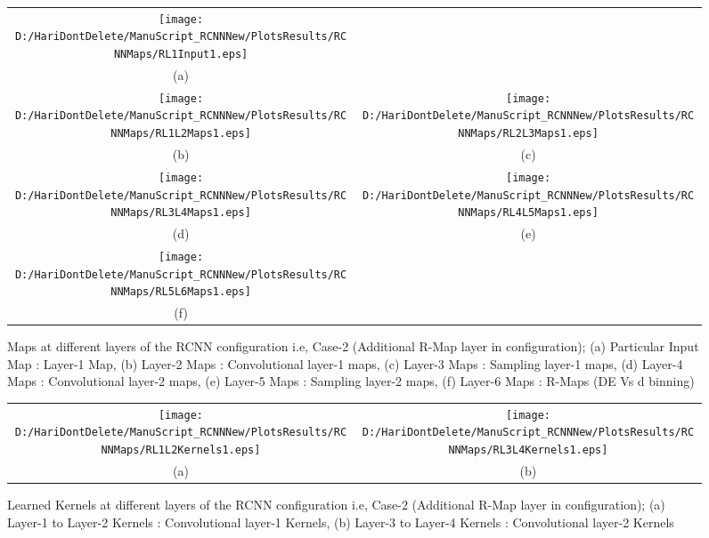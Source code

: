 
\begin{figure*}
\begin{tabular}{cc}
\texttt{[image: D:/HariDontDelete/ManuScript\_RCNNNew/PlotsResults/RCNNMaps/RL1Input1.eps]}\\
(a) & \\
\texttt{[image: D:/HariDontDelete/ManuScript\_RCNNNew/PlotsResults/RCNNMaps/RL1L2Maps1.eps]}&\texttt{[image: D:/HariDontDelete/ManuScript\_RCNNNew/PlotsResults/RCNNMaps/RL2L3Maps1.eps]}\\
(b)  & (c) \\
\texttt{[image: D:/HariDontDelete/ManuScript\_RCNNNew/PlotsResults/RCNNMaps/RL3L4Maps1.eps]}&\texttt{[image: D:/HariDontDelete/ManuScript\_RCNNNew/PlotsResults/RCNNMaps/RL4L5Maps1.eps]}\\
(d)  & (e) \\
\texttt{[image: D:/HariDontDelete/ManuScript\_RCNNNew/PlotsResults/RCNNMaps/RL5L6Maps1.eps]}\\
(f)   \\
\end{tabular}
\caption{ Maps at different layers of the RCNN configuration i.e, Case-2 (Additional R-Map layer in configuration); (a) Particular Input Map : Layer-1 Map, (b) Layer-2 Maps : Convolutional layer-1 maps, (c) Layer-3 Maps : Sampling layer-1 maps, (d) Layer-4 Maps : Convolutional layer-2 maps, (e) Layer-5 Maps : Sampling layer-2 maps, (f) Layer-6 Maps : R-Maps (DE Vs d binning)}
\label{FIG:RL1L2L3L4L5L6Maps}
\end{figure*}





\begin{figure*}
\begin{tabular}{cc}
\texttt{[image: D:/HariDontDelete/ManuScript\_RCNNNew/PlotsResults/RCNNMaps/RL1L2Kernels1.eps]}&\texttt{[image: D:/HariDontDelete/ManuScript\_RCNNNew/PlotsResults/RCNNMaps/RL3L4Kernels1.eps]}\\
(a)  & (b) \\
\end{tabular}
\caption{ Learned Kernels at different layers of the RCNN configuration i.e, Case-2 (Additional R-Map layer in configuration); (a) Layer-1 to Layer-2 Kernels : Convolutional layer-1 Kernels, (b) Layer-3 to Layer-4 Kernels : Convolutional layer-2 Kernels}
\label{FIG:RConvKernels}
\end{figure*}

